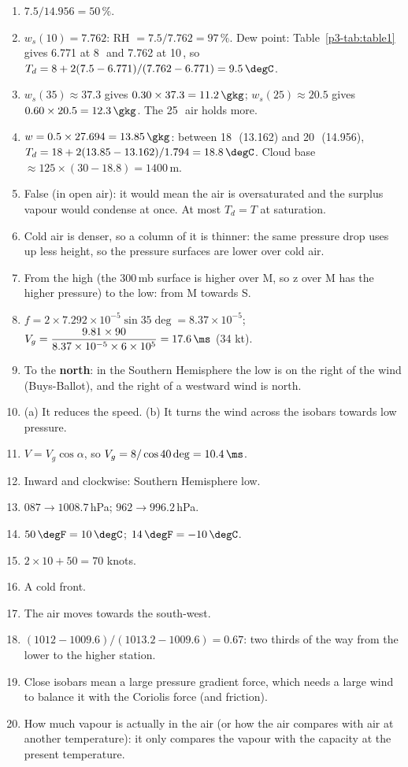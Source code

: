 \begin{answerbox}
\begin{enumerate}[label=\textbf{S\arabic*.},leftmargin=*,itemsep=3pt]
\item $7.5/14.956=50\,\%$.
\item $w_s(10)=7.762$: RH $=7.5/7.762=97\,\%$. Dew point: Table~\ref{p3-tab:table1} gives 6.771 at 8\,\degC\ and 7.762 at 10\,\degC, so $T_d=8+2(7.5-6.771)/(7.762-6.771)=9.5\,\degC$.
\item $w_s(35)\approx37.3$ gives $0.30\times37.3=11.2\,\gkg$; $w_s(25)\approx20.5$ gives $0.60\times20.5=12.3\,\gkg$. The 25\,\degC\ air holds more.
\item $w=0.5\times27.694=13.85\,\gkg$: between 18\,\degC\ (13.162) and 20\,\degC\ (14.956), $T_d=18+2(13.85-13.162)/1.794=18.8\,\degC$. Cloud base $\approx125\times(30-18.8)=1400$\,m.
\item False (in open air): it would mean the air is oversaturated and the surplus vapour would condense at once. At most $T_d=T$ at saturation.
\item Cold air is denser, so a column of it is thinner: the same pressure drop uses up less height, so the pressure surfaces are lower over cold air.
\item From the high (the 300\,mb surface is higher over M, so z over M has the higher pressure) to the low: from M towards S.
\item $f=2\times7.292\times10^{-5}\sin35\deg=8.37\times10^{-5}$; $V_g=\dfrac{9.81\times90}{8.37\times10^{-5}\times6\times10^{5}}=17.6\,\ms$ (34 kt).
\item To the \textbf{north}: in the Southern Hemisphere the low is on the right of the wind (Buys-Ballot), and the right of a westward wind is north.
\item (a) It reduces the speed. (b) It turns the wind across the isobars towards low pressure.
\item $V=V_g\cos\alpha$, so $V_g=8/\cos40\deg=10.4\,\ms$.
\item Inward and clockwise: Southern Hemisphere low.
\item $087\to1008.7$\,hPa; $962\to996.2$\,hPa.
\item $50\,\degF=10\,\degC$; $14\,\degF=-10\,\degC$.
\item $2\times10+50=70$ knots.
\item A cold front.
\item The air moves towards the south-west.
\item $(1012-1009.6)/(1013.2-1009.6)=0.67$: two thirds of the way from the lower to the higher station.
\item Close isobars mean a large pressure gradient force, which needs a large wind to balance it with the Coriolis force (and friction).
\item How much vapour is actually in the air (or how the air compares with air at another temperature): it only compares the vapour with the capacity at the present temperature.
\end{enumerate}
\end{answerbox}

